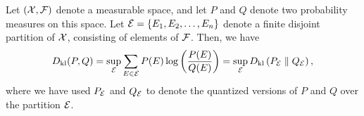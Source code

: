             \begin{theorem}
                \label{thm:variational-rep-1}
                Let $(\mathcal{X}, \mathcal{F})$ denote a measurable space, and let $P$ and $Q$ denote two probability measures on this space. Let $\mathcal{E} = \{E_1, E_2, \ldots, E_n\}$ denote a finite disjoint partition of $\mathcal{X}$, consisting of elements of $\mathcal{F}$. Then, we have  
                \begin{align}
                    D_{\text{kl}}(P, Q) = \sup_{\mathcal{E}} \sum_{E \in \mathcal{E}} P(E) \log \left( \frac{P(E)}{Q(E)} \right) = \sup_{\mathcal{E}}  D_{\text{kl}} \left( P_{\mathcal{E}} \parallel Q_{\mathcal{E}} \right), 
                \end{align}
                where we have used $P_{\mathcal{E}}$ and $Q_{\mathcal{E}}$ to denote the quantized versions of $P$ and $Q$ over the partition $\mathcal{E}$. 
            \end{theorem}

